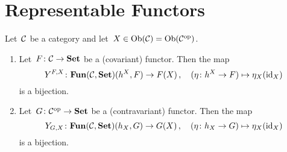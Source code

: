 \section{Representable Functors}


\begin{lemma}
  \label{yoneda lemma}
  Let~$\mathcal{C}$ be a category and let~$X \in \operatorname{Ob}(\mathcal{C}) = \operatorname{Ob}(\mathcal{C}^{\mathrm{op}})$.
  \begin{enumerate}
    \item
      \label{covariant yoneda}
      Let~$F \colon \mathcal{C} \to \mathbf{Set}$ be a (covariant) functor.
      Then the map
      \[
                Y^{F,X}
        \colon  \mathbf{Fun}(\mathcal{C}, \mathbf{Set})(h^X, F)
        \to     F(X) \,,
        \quad   ( \eta \colon h^X \to F)
        \mapsto \eta_X(\mathrm{id}_X)
      \]
      is a bijection.
    \item
      \label{contravariant yoneda}
      Let~$G \colon \mathcal{C}^{\mathrm{op}} \to \mathbf{Set}$ be a (contravariant) functor.
      Then the map
      \[
                Y_{G,X}
        \colon  \mathbf{Fun}(\mathcal{C}, \mathbf{Set})(h_X, G)
        \to     G(X) \,,
        \quad   ( \eta \colon h_X \to G)
        \mapsto \eta_X(\mathrm{id}_X)
      \]
      is a bijection.
  \end{enumerate}
\end{lemma}


